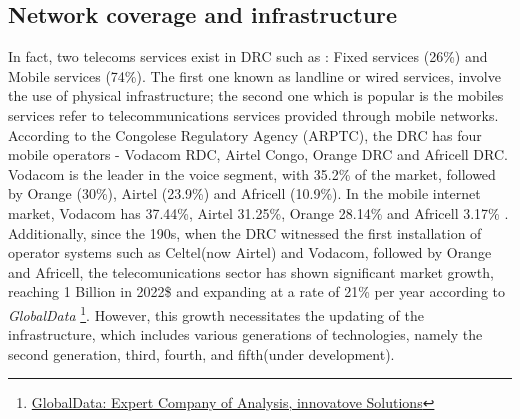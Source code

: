 \documentclass[12pt,a4paper]{report}
\begin{document}
	   \subsection{Network coverage and infrastructure}   
	    In fact, two telecoms services exist in DRC such as : Fixed services (26\%) and Mobile services (74\%). The first one known as landline or wired services, involve the use of physical infrastructure; the second one which is popular is the mobiles services refer to telecommunications services provided through mobile networks.
	    According to the Congolese Regulatory Agency (ARPTC), the DRC has four mobile operators - Vodacom RDC,
	    Airtel Congo, Orange DRC and Africell DRC. Vodacom is the leader in the voice segment, with 35.2\% of the market,
	    followed by Orange (30\%), Airtel (23.9\%) and Africell (10.9\%). In the mobile internet market, Vodacom has 37.44\%, Airtel
	    31.25\%, Orange 28.14\% and Africell 3.17\% \cite{stateInternet2019}. 
	     	 \\
	     	     	        
	   Additionally, since the 190s, when the DRC witnessed the first installation of operator systems such as Celtel(now Airtel) and Vodacom, followed by Orange and Africell, the telecomunications sector has shown significant market growth, reaching 1 Billion in 2022\$ and expanding at a rate of 21\% per year according to  \textit{GlobalData} \footnote{\href{https://www.globaldata.com/store/report/drc-telecom-operators-market-analysis/}{GlobalData: Expert Company of Analysis, innovatove Solutions}}. 
	   However, this growth necessitates the updating of the infrastructure, which includes various generations of technologies, namely the second generation, third, fourth, and fifth(under development).\\
	   	   
\end{document}

